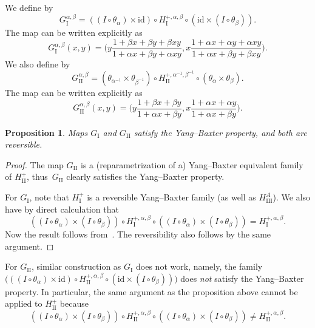 \documentclass[pdftex]{sigma}
\numberwithin{equation}{section}
\newtheorem{Proposition}[Theorem]{Proposition}
 { \theoremstyle{definition}
\newtheorem{Definition}[Theorem]{Definition}
\newtheorem{Note}[Theorem]{Note}
\newtheorem{Example}[Theorem]{Example}
\newtheorem{Remark}[Theorem]{Remark} }
\def\id{\mathrm{id}}
\begin{document}
We define  by
\[
G_{\mathrm{I}}^{\alpha,\beta}=((I\circ\theta_{\alpha})\times\id)
\circ H_{\mathrm{I}}^{+,\alpha,\beta}\circ(\id\times(I\circ\theta_{\beta})).
\]
The map  can be written explicitly as
\[
G_{\mathrm{I}}^{\alpha,\beta}(x,y)
=\biggl(y\frac{1+\beta x+\beta y+\beta xy}{1+\alpha x+\beta y+\alpha xy},x\frac{1+\alpha x+\alpha y+\alpha xy}{1+\alpha x+\beta y+\beta xy}\biggr).
\]
We also define  by
\[
G_{\mathrm{II}}^{\alpha,\beta}
=(\theta_{\alpha^{-1}}\times\theta_{\beta^{-1}})\circ
H_{\mathrm{II}}^{+,\alpha^{-1},\beta^{-1}}\circ(\theta_{\alpha}\times\theta_{\beta}).
\]
The map  can be written explicitly as
\[
G_{\mathrm{II}}^{\alpha,\beta}(x,y)
=\biggl(y\frac{1+\beta x+\beta y}{1+\alpha x+\beta y},x\frac{1+\alpha x+\alpha y}{1+\alpha x+\beta y}\biggr).
\]

\begin{Proposition}
Maps $G_{\mathrm{I}}$ and $G_{\mathrm{II}}$ satisfy the Yang--Baxter property, and both are reversible.
\end{Proposition}
\begin{proof}
The map $G_{\mathrm{II}}$ is a
(reparametrization of a) Yang--Baxter equivalent family of $H_{\mathrm{II}}^+$,
thus~$G_{\mathrm{II}}$ clearly satisfies the Yang--Baxter property.

For $G_{\mathrm{I}}$, note that $H_{\mathrm{I}}^+$ is a reversible Yang--Baxter family
\big(as well as $H_{\mathrm{III}}^A$\big).
We also have by direct calculation that
\[
((I\circ\theta_{\alpha})\times(I\circ\theta_{\beta}))\circ
H_{\mathrm{I}}^{+,\alpha,\beta}\circ
((I\circ\theta_{\alpha})\times(I\circ\theta_{\beta}))
=H_{\mathrm{I}}^{+,\alpha,\beta}.
\]
Now the result follows from~\cite[Proposition~2]{PSTV}.
The reversibility also follows by the same argument.
\end{proof}


\begin{Remark}
For $G_{\mathrm{II}}$, similar construction as $G_{\mathrm{I}}$ does not work,
namely, the family
$\bigl(((I\circ\theta_{\alpha})\times\id)
\circ H_{\mathrm{II}}^{+,\alpha,\beta}\circ(\id\times(I\circ\theta_{\beta}))
\bigr)$ does {\it not} satisfy the Yang--Baxter property.
In particular, the same argument as the proposition above cannot be
applied to $H_{\mathrm{II}}^+$ because
\[
((I\circ\theta_{\alpha})\times(I\circ\theta_{\beta}))\circ
H_{\mathrm{II}}^{+,\alpha,\beta}\circ
((I\circ\theta_{\alpha})\times(I\circ\theta_{\beta}))
\ne H_{\mathrm{II}}^{+,\alpha,\beta}.
\]
\end{Remark}
\end{document}
